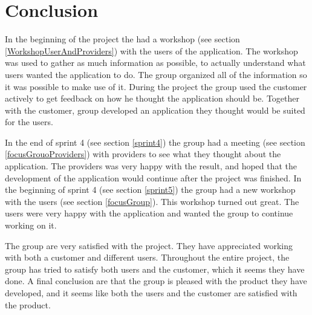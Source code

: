 \section{Conclusion}
In the beginning of the project the had a workshop (see section \ref{WorkshopUserAndProviders}) with the users of the application. The workshop was used to gather as much information as possible, to actually understand what users wanted the application to do. The group organized all of the information so it was possible to make use of it. During the project the group used the customer actively to get feedback on how he thought the application should be. Together with the customer, group developed an application they thought would be suited for the users. 

In the end of sprint 4 (see section \ref{sprint4}) the group had a meeting (see section \ref{focusGrouoProviders}) with providers to see what they thought about the application. The providers was very happy with the result, and hoped that the development of the application would continue after the project was finished. In the beginning of sprint 4 (see section \ref{sprint5}) the group had a new workshop with the users (see section \ref{focusGroup}). This workshop turned out great. The users were very happy with the application and wanted the group to continue working on it. 

The group are very satisfied with the project. They have appreciated working with both a customer and different users. Throughout the entire project, the group has tried to satisfy both users and the customer, which it seems they have done. A final conclusion are that the group is pleased with the product they have developed, and it seems like both the users and the customer are satisfied with the product. 



\cleardoublepage